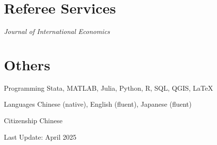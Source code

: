 \documentclass[11pt,letterpaper]{report}
\begin{document}
    \section*{Referee Services}
    \textit{Journal of International Economics}

    \section*{Others}

    \begin{tablist}

        \item[Programming] \tab{}Stata, MATLAB, Julia, Python, R, SQL, QGIS, \LaTeX
        \item[Languages] \tab{}Chinese (native), English (fluent), Japanese (fluent)
        \item[Citizenship] \tab{}Chinese
    \end{tablist}

    \vspace{20pt}
    Last Update: April 2025
\end{document}
